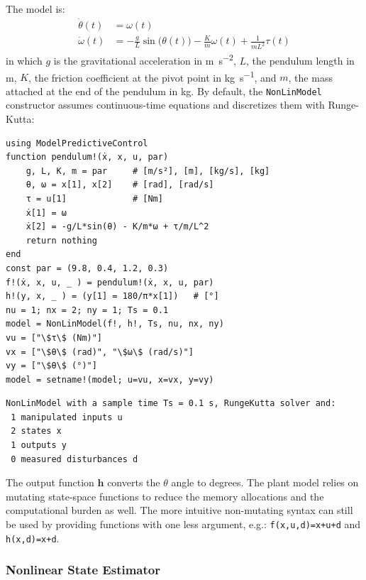 The model is:
\begin{subequations}
\begin{align}
\dot{\theta}(t) &= \omega(t) \\
\dot{\omega}(t) &= -\frac{g}{L}\sin\big(\theta(t)\big) -\frac{K}{m}\omega(t) + \frac{1}{m L^2}\tau(t) \label{eq.pendulum_speed}
\end{align}
\end{subequations}
in which $g$ is the gravitational acceleration in \si{\meter\per\second\squared}, $L$, the pendulum length in \si{\meter}, $K$, the friction coefficient at the pivot point in \si{\kilogram\per\second}, and $m$, the mass attached at the end of the pendulum in \si{\kilogram}. By default, the \texttt{NonLinModel} constructor assumes continuous-time equations and discretizes them with Runge-Kutta:
\vspace*{-5pt}
\begin{verbatim}
using ModelPredictiveControl
function pendulum!(ẋ, x, u, par)
    g, L, K, m = par     # [m/s²], [m], [kg/s], [kg]
    θ, ω = x[1], x[2]    # [rad], [rad/s]
    τ = u[1]             # [Nm]
    ẋ[1] = ω
    ẋ[2] = -g/L*sin(θ) - K/m*ω + τ/m/L^2
    return nothing
end
const par = (9.8, 0.4, 1.2, 0.3)
f!(ẋ, x, u, _ ) = pendulum!(ẋ, x, u, par)
h!(y, x, _ ) = (y[1] = 180/π*x[1])   # [°]
nu = 1; nx = 2; ny = 1; Ts = 0.1
model = NonLinModel(f!, h!, Ts, nu, nx, ny)
vu = ["\$τ\$ (Nm)"]
vx = ["\$θ\$ (rad)", "\$ω\$ (rad/s)"]
vy = ["\$θ\$ (°)"]
model = setname!(model; u=vu, x=vx, y=vy)
\end{verbatim}
\spacerepl
\begin{verbatim}
NonLinModel with a sample time Ts = 0.1 s, RungeKutta solver and:
 1 manipulated inputs u
 2 states x
 1 outputs y
 0 measured disturbances d
\end{verbatim}

The output function $\mathbf{h}$ converts the $\theta$ angle to degrees. The plant model relies on mutating state-space functions to reduce the memory allocations and the computational burden as well. The more intuitive non-mutating syntax can still be used by providing functions with one less argument, e.g.: \texttt{f(x,u,d)=x+u+d} and \texttt{h(x,d)=x+d}.

\subsubsection{Nonlinear State Estimator}

